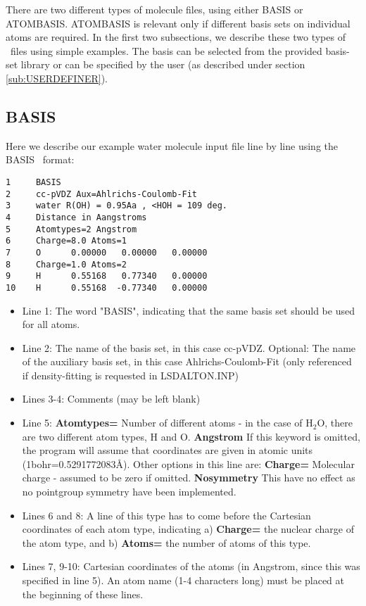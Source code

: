 There are two different types of molecule files, using either BASIS or ATOMBASIS.
ATOMBASIS is relevant only if different basis sets on individual atoms are required.
In the first two subsections, we describe these two types of \mol\ files using simple examples.
The basis can be selected from the provided basis-set library or can be specified by 
the user (as described under section \ref{sub:USERDEFINER}).

\subsection{BASIS}


Here we describe our example water molecule input file line by line using the BASIS \mol\ format:
\begin{verbatim}
1     BASIS
2     cc-pVDZ Aux=Ahlrichs-Coulomb-Fit
3     water R(OH) = 0.95Aa , <HOH = 109 deg.
4     Distance in Aangstroms
5     Atomtypes=2 Angstrom
6     Charge=8.0 Atoms=1
7     O      0.00000   0.00000   0.00000
8     Charge=1.0 Atoms=2
9     H      0.55168   0.77340   0.00000
10    H      0.55168  -0.77340   0.00000
\end{verbatim} 

\begin{itemize}
\item Line 1: The word "BASIS", indicating that the same basis set should be used for all 
atoms.
\item Line 2: The name of the basis set, in this case cc-pVDZ. Optional: The name
of the auxiliary basis set, in this case Ahlrichs-Coulomb-Fit
(only referenced if density-fitting is requested in LSDALTON.INP)
\item Lines 3-4: Comments (may be left blank)
\item Line 5: {\bf Atomtypes=} Number of different atoms - in the case of H$_2$O, there are two different
atom types, H and O. {\bf Angstrom} If this keyword is omitted, the program will assume that coordinates
are given in atomic units (1bohr=0.5291772083{\AA}). Other options in this line are:
{\bf Charge=} Molecular charge - assumed to be zero if omitted. 
{\bf Nosymmetry} This have no effect as no pointgroup symmetry have been implemented. 
\item Lines 6 and 8: A line of this type has to come before the Cartesian coordinates of each atom
type, indicating a) {\bf Charge=} the nuclear charge of the atom type, and b) {\bf Atoms=} the number of atoms of this type.
\item Lines 7, 9-10: Cartesian coordinates of the atoms (in Angstrom, since this was specified 
in line 5). An atom name (1-4 characters long) must be placed at the beginning of these lines.
\end{itemize}

